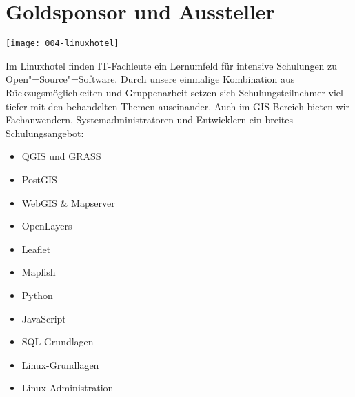 \section*{Goldsponsor und Aussteller}
\begin{center}
  \texttt{[image: 004-linuxhotel]}
\end{center}
Im Linuxhotel finden IT-Fachleute ein Lernumfeld für intensive Schulungen zu
Open"=Source"=Software. Durch unsere einmalige Kombination aus
Rückzugsmöglichkeiten und Gruppenarbeit setzen sich Schulungsteilnehmer viel
tiefer mit den behandelten Themen auseinander.  Auch im GIS-Bereich bieten wir
Fachanwendern, Systemadministratoren und Entwicklern ein breites
Schulungsangebot:

\begin{itemize}
  \setlength{\itemsep}{-3pt}
  \item QGIS und GRASS
  \item PostGIS
  \item WebGIS \& Mapserver
  \item OpenLayers
  \item Leaflet
  \item Mapfish
  \item Python
  \item JavaScript
  \item SQL-Grundlagen
  \item Linux-Grundlagen
  \item Linux-Administration
\end{itemize}
